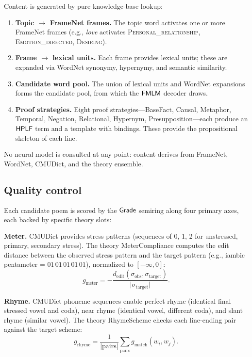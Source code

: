 Content is generated by pure knowledge-base lookup:
\begin{enumerate}
  \item \textbf{Topic $\to$ FrameNet frames.}\;
        The topic word activates one or more FrameNet frames
        (e.g., \emph{love} activates \textsc{Personal\_relationship},
        \textsc{Emotion\_directed}, \textsc{Desiring}).
  \item \textbf{Frame $\to$ lexical units.}\;
        Each frame provides lexical units; these are expanded via
        WordNet synonymy, hypernymy, and semantic similarity.
  \item \textbf{Candidate word pool.}\;
        The union of lexical units and WordNet expansions forms
        the candidate pool, from which the $\mathsf{FMLM}$ decoder draws.
  \item \textbf{Proof strategies.}\;
        Eight proof strategies---\textsf{BaseFact}, \textsf{Causal},
        \textsf{Metaphor}, \textsf{Temporal}, \textsf{Negation},
        \textsf{Relational}, \textsf{Hypernym},
        \textsf{Presupposition}---each produce an $\mathsf{HPLF}$ term and
        a template with bindings.  These provide the propositional
        skeleton of each line.
\end{enumerate}

No neural model is consulted at any point: content derives from
FrameNet, WordNet, CMUDict, and the theory ensemble.

\subsection{Quality control}
\label{ssec:quality}

Each candidate poem is scored by the $\mathsf{Grade}$ semiring along four
primary axes, each backed by specific theory slots:

\medskip\noindent\textbf{Meter.}\;
CMUDict provides stress patterns (sequences of 0, 1, 2 for
unstressed, primary, secondary stress).  The theory
\textsf{MeterCompliance} computes the edit distance between the
observed stress pattern and the target pattern (e.g., iambic
pentameter = $01\,01\,01\,01\,01$), normalized to $[-\infty, 0]$:
\[
  g_{\mathrm{meter}} = -\frac{d_{\mathrm{edit}}(\sigma_{\mathrm{obs}},
    \sigma_{\mathrm{target}})}{\lvert \sigma_{\mathrm{target}} \rvert}.
\]

\medskip\noindent\textbf{Rhyme.}\;
CMUDict phoneme sequences enable perfect rhyme (identical final
stressed vowel and coda), near rhyme (identical vowel, different
coda), and slant rhyme (similar vowel).  The theory
\textsf{RhymeScheme} checks each line-ending pair against the
target scheme:
\[
  g_{\mathrm{rhyme}} = \frac{1}{|\text{pairs}|}\sum_{\text{pairs}}
    g_{\mathrm{match}}(w_i, w_j).
\]

